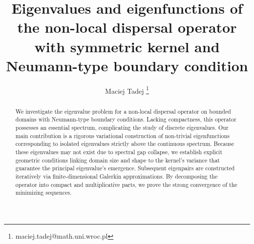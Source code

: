 \documentclass[12pt, a4paper]{article}
\title{Eigenvalues and eigenfunctions of the non-local dispersal operator with symmetric kernel and Neumann-type boundary condition}
\author[1]{Maciej Tadej \thanks{maciej.tadej@math.uni.wroc.pl}}
\affil[1]{\textit{Mathematical Institute, University of Wrocław, pl. Grunwaldzki 2, 50-384 Wrocław, Poland}}
\date{}
\theoremstyle{break}
\theoremstyle{break}
\theoremstyle{break}
\theoremstyle{break}
\theoremstyle{break}
\theoremstyle{break}
\theoremstyle{break}
\theoremstyle{break}
\theoremstyle{break}
\begin{document}
\maketitle

\hspace{20pt}

\begin{abstract}
    We investigate the eigenvalue problem for a non-local dispersal operator on bounded domains with Neumann-type boundary conditions. Lacking compactness, this operator possesses an essential spectrum, complicating the study of discrete eigenvalues. Our main contribution is a rigorous variational construction of non-trivial eigenfunctions corresponding to isolated eigenvalues strictly above the continuous spectrum. Because these eigenvalues may not exist due to spectral gap collapse, we establish explicit geometric conditions linking domain size and shape to the kernel's variance that guarantee the principal eigenvalue's emergence. Subsequent eigenpairs are constructed iteratively via finite-dimensional Galerkin approximations. By decomposing the operator into compact and multiplicative parts, we prove the strong convergence of the minimizing sequences.
\end{abstract}
\end{document}
